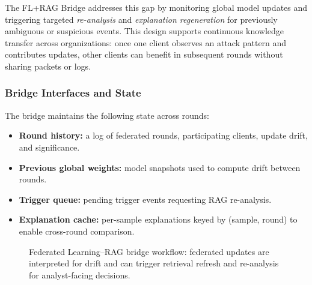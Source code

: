 \documentclass[conference]{IEEEtran}
\begin{document}
The FL+RAG Bridge addresses this gap by monitoring global model updates and triggering targeted \emph{re-analysis} and \emph{explanation regeneration} for previously ambiguous or suspicious events. This design supports continuous knowledge transfer across organizations: once one client observes an attack pattern and contributes updates, other clients can benefit in subsequent rounds without sharing packets or logs.

\subsubsection{Bridge Interfaces and State}
\label{sec:bridge-interfaces}

The bridge maintains the following state across rounds:
\begin{itemize}
  \item \textbf{Round history:} a log of federated rounds, participating clients, update drift, and significance.
  \item \textbf{Previous global weights:} model snapshots used to compute drift between rounds.
  \item \textbf{Trigger queue:} pending trigger events requesting RAG re-analysis.
  \item \textbf{Explanation cache:} per-sample explanations keyed by (sample, round) to enable cross-round comparison.
\end{itemize}

\begin{figure}[H]
\centering
{}
\caption{Federated Learning--RAG bridge workflow: federated updates are interpreted for drift and can trigger retrieval refresh and re-analysis for analyst-facing decisions.}
\label{fig:fed_rag_workflow}
\end{figure}
\end{document}
